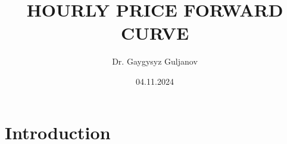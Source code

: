 \documentclass{beamer}
\title{
    \fontsize{12pt}{15pt} \selectfont
    HOURLY PRICE FORWARD CURVE
}
\author{Dr. Gaygysyz Guljanov}
\institute{University of Münster}
\date{04.11.2024}
\begin{document}
\frame{\titlepage}


\section{Introduction}



\end{document}
